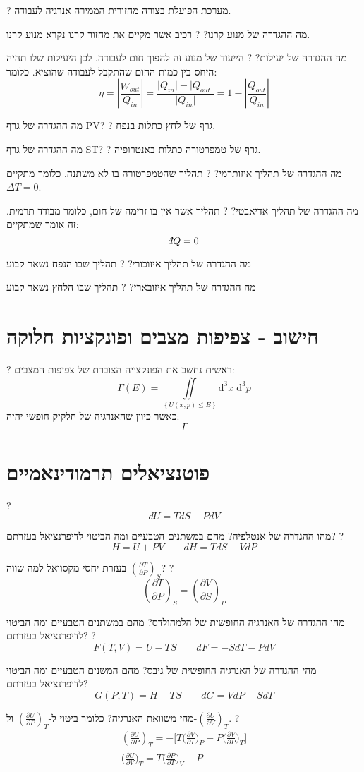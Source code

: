 \documentclass{tstextbook}
\begin{document}
?
מערכת הפועלת בצורה מחזורית הממירה אנרגיה לעבודה.

מה ההגדרה של מנוע קרנו?
?
רכיב אשר מקיים את מחזור קרנו נקרא מנוע קרנו.

מה ההגדרה של יעילות?
?
הייעוד של מנוע זה להפוך חום לעבודה. לכן היעילות שלו תהיה היחס בין כמות החום שהתקבל לעבודה שהוציא. כלומר:
$$\eta = \left\lvert  \frac{W_{out}}{Q_{in}}  \right\rvert = \frac{\lvert Q_{in} \rvert -\lvert Q_{out} \rvert}{\lvert Q_{in} \rvert }=1-\left\lvert  \frac{Q_{out}}{Q_{in}}  \right\rvert  $$

מה ההגדרה של גרף PV?
?
גרף של לחץ כתלות בנפח.

מה ההגדרה של גרף ST?
?
גרף של טמפרטורה כתלות באנטרופיה.

מה ההגדרה של תהליך איזותרמי?
?
תהליך שהטמפרטורה בו לא משתנה. כלומר מתקיים \(\Delta T=0\).

מה ההגדרה של תהליך אדיאבטי?
?
תהליך אשר אין בו זרימה של חום, כלומר מבודד תרמית. זה אומר שמתקיים:
$$\;\bar{}\mkern-7.5mu dQ=0$$

מה ההגדרה של תהליך איזוכורי?
?
תהליך שבו הנפח נשאר קבוע

מה ההגדרה של תהליך איזובארי?
?
תהליך שבו הלחץ נשאר קבוע

\section{חישוב - צפיפות מצבים ופונקציות חלוקה}

?
ראשית נחשב את הפונקצייה הצוברת של צפיפות המצבים:
$$\Gamma(E)=\iint\limits_{\left\{  U(x,p)\leq E  \right\}}\mathrm{d^{3}}x\;\mathrm{d}^{3}p$$
כאשר כיוון שהאנרגיה של חלקיק חופשי יהיה:
$$\Gamma$$

\section{פוטנציאלים תרמודינאמיים}

?
$$d U=T d S-P d V$$

מהו ההגדרה של אנטלפיה? מהם במשתנים הטבעיים ומה הביטוי לדיפרנציאל בעזרתם?
?
$$H=U+PV\qquad d H=T d S+V d P$$

בעזרת יחסי מקסוואל למה שווה \(\left( \frac{\partial T}{\partial P} \right)_{S}\)?
?
$$\left( \frac{\partial T}{\partial P} \right)_{S}=\left( \frac{\partial V}{\partial S}  \right)_{P} $$

מהו ההגדרה של האנרגיה החופשית של הלמהולדס? מהם במשתנים הטבעיים ומה הביטוי לדיפרנציאל בעזרתם?
?
$$F(T,V)=U-TS\qquad dF=-SdT-PdV$$

מהי ההגדרה של האנרגיה החופשית של גיבס? מהם המשנים הטבעיים ומה הביטוי לדיפרנציאל בעזרתם?
$$G(P,T)=H-TS\qquad dG=VdP-SdT$$

מהי משוואת האנרגיה? כלומר ביטוי ל-\(\left( \frac{\partial U}{\partial P} \right)_{T}\) ול-\(\left( \frac{\partial U}{\partial V} \right)_{T}\).
?
\begin{gather*}\left({\frac{\partial U}{\partial P}}\right)_{T}=-\Biggl[T\biggl({\frac{\partial V}{\partial T}}\biggr)_{P}+P\biggl({\frac{\partial V}{\partial P}}\biggr)_{T}\Biggr]  \\\Biggl({\frac{\partial U}{\partial V}}\Biggr)_{T}=T\Biggl({\frac{\partial P}{\partial T}}\Biggr)_{V}-P
\end{gather*}
\end{document}
